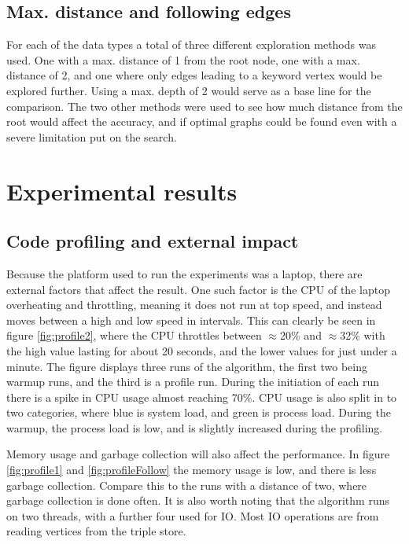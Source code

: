 \subsection{Max. distance and following edges}
For each of the data types a total of three different exploration methods was used. One with a max. distance of 1 from the root node, one with a max. distance of 2, and one where only edges leading to a keyword vertex would be explored further. Using a max. depth of 2 would serve as a base line for the comparison. The two other methods were used to see how much distance from the root would affect the accuracy, and if optimal graphs could be found even with a severe limitation put on the search.

\section{Experimental results}
\label{sec:experimentalResults}
\subsection{Code profiling and external impact}
Because the platform used to run the experiments was a laptop, there are external factors that affect the result. One such factor is the CPU of the laptop overheating and throttling, meaning it does not run at top speed, and instead moves between a high and low speed in intervals. This can clearly be seen in figure \ref{fig:profile2}, where the CPU throttles between $\approx$20\% and $\approx$32\% with the high value lasting for about 20 seconds, and the lower values for just under a minute. The figure displays three runs of the algorithm, the first two being warmup runs, and the third is a profile run. During the initiation of each run there is a spike in CPU usage almost reaching 70\%. CPU usage is also split in to two categories, where blue is system load, and green is process load. During the warmup, the process load is low, and is slightly increased during the profiling.

Memory usage and garbage collection will also affect the performance. In figure \ref{fig:profile1} and \ref{fig:profileFollow} the memory usage is low, and there is less garbage collection. Compare this to the runs with a distance of two, where garbage collection is done often. It is also worth noting that the algorithm runs on two threads, with a further four used for IO. Most IO operations are from reading vertices from the triple store.

